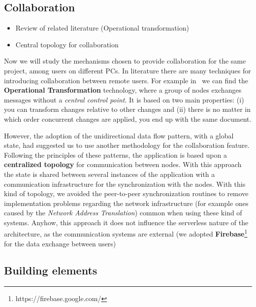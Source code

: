 \subsection{Collaboration}

\begin{itemize}
 \item Review of related literature (Operational transformation)
 \item Central topology for collaboration
\end{itemize}

Now we will study the mechanisms chosen to provide collaboration for the same project, among users on different PCs. In literature there are many techniques for introducing collaboration between remote users. For example in~\cite{Ellis:1989:CCG:66926.66963} we can find the \textbf{Operational Transformation} technology, where a group of nodes exchanges messages without a \textit{central control point}. It is based on two main properties: (i) you can transform changes relative to other changes and (ii) there is no matter in which order concurrent changes are applied, you end up with the same document.

However, the adoption of the unidirectional data flow pattern, with a global state, had suggested us to use another methodology for the collaboration feature. Following the principles of these patterns, the application is based upon a \textbf{centralized topology} for communication between nodes. With this approach the state is shared between several instances of the application with a communication infrastructure for the synchronization with the nodes. With this kind of topology, we avoided the peer-to-peer synchronization routines to remove implementation problems regarding the network infrastructure (for example ones caused by the \textit{Network Address Translation}) common when using these kind of systems. Anyhow, this approach it does not influence the serverless nature of the architecture, as the communication systems are external (we adopted \textbf{Firebase}\footnote{https://firebase.google.com/} for the data exchange between users)


\subsection{Building elements}\label{building_elements}

